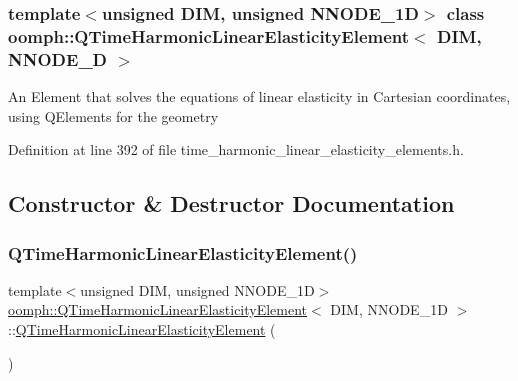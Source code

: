 \subsubsection*{template$<$unsigned D\+IM, unsigned N\+N\+O\+D\+E\+\_\+1D$>$\newline
class oomph\+::\+Q\+Time\+Harmonic\+Linear\+Elasticity\+Element$<$ D\+I\+M, N\+N\+O\+D\+E\+\_\+D $>$}

An Element that solves the equations of linear elasticity in Cartesian coordinates, using Q\+Elements for the geometry 

Definition at line 392 of file time\+\_\+harmonic\+\_\+linear\+\_\+elasticity\+\_\+elements.\+h.



\subsection{Constructor \& Destructor Documentation}
\mbox{\label{classoomph_1_1QTimeHarmonicLinearElasticityElement_a8c5f0a70c86dc31824f29fd90616c4c2}} 
\subsubsection{\texorpdfstring{Q\+Time\+Harmonic\+Linear\+Elasticity\+Element()}{QTimeHarmonicLinearElasticityElement()}}
{\footnotesize\ttfamily template$<$unsigned D\+IM, unsigned N\+N\+O\+D\+E\+\_\+1D$>$ \\
\hyperlink{classoomph_1_1QTimeHarmonicLinearElasticityElement}{oomph\+::\+Q\+Time\+Harmonic\+Linear\+Elasticity\+Element}$<$ D\+IM, N\+N\+O\+D\+E\+\_\+1D $>$\+::\hyperlink{classoomph_1_1QTimeHarmonicLinearElasticityElement}{Q\+Time\+Harmonic\+Linear\+Elasticity\+Element} (\begin{DoxyParamCaption}{ }\end{DoxyParamCaption})\hspace{0.3cm}{\ttfamily [inline]}}



